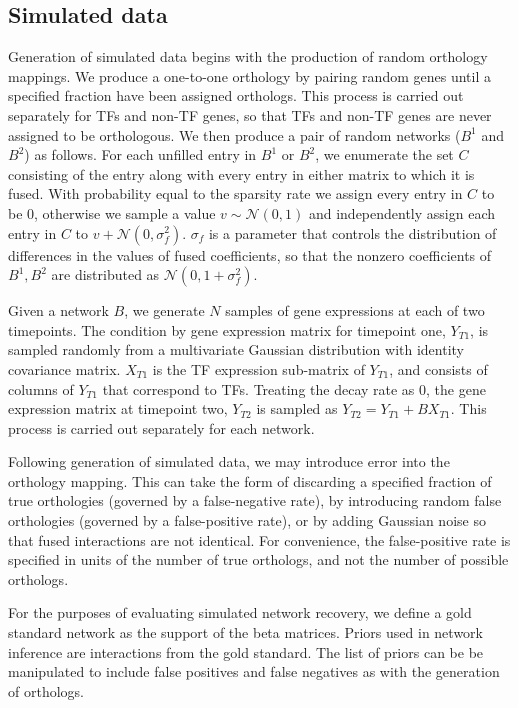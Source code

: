 \documentclass[11pt]{article}
\begin{document}
\subsection{Simulated data}
Generation of simulated data begins with the production of random orthology mappings. We produce a one-to-one orthology by pairing random genes until a specified fraction have been assigned orthologs. This process is carried out separately for TFs and non-TF genes, so that TFs and non-TF genes are never assigned to be orthologous. We then produce a pair of random networks ($B^1$ and $B^2$) as follows. For each unfilled entry in $B^1$ or $B^2$, we enumerate the set $C$ consisting of the entry along with every entry in either matrix to which it is fused. With probability equal to the sparsity rate we assign every entry in $C$ to be 0, otherwise we sample a value $v \sim \mathcal{N}(0,1)$ and independently assign each entry in $C$ to $v + \mathcal{N}(0, \sigma_f^2)$. $\sigma_f$ is a parameter that controls the distribution of differences in the values of fused coefficients, so that the nonzero coefficients of $B^1, B^2$ are distributed as $\mathcal{N}(0, 1 + \sigma_f^2)$.

Given a network $B$, we generate $N$ samples of gene expressions at each of two timepoints. The condition by gene expression matrix for timepoint one, $Y_{T1}$, is sampled randomly from a multivariate Gaussian distribution with identity covariance matrix. $X_{T1}$ is the TF expression sub-matrix of $Y_{T1}$, and consists of columns of $Y_{T1}$ that correspond to TFs. Treating the decay rate as 0, the gene expression matrix at timepoint two, $Y_{T2}$ is sampled as $Y_{T2} = Y_{T1} + BX_{T1}$. This process is carried out separately for each network. 

Following generation of simulated data, we may introduce error into the orthology mapping. This can take the form of discarding a specified fraction of true orthologies (governed by a false-negative rate), by introducing random false orthologies (governed by a false-positive rate), or by adding Gaussian noise so that fused interactions are not identical. For convenience, the false-positive rate is specified in units of the number of true orthologs, and not the number of possible orthologs. 

For the purposes of evaluating simulated network recovery, we define a gold standard network as the support of the beta matrices. Priors used in network inference are interactions from the gold standard. The list of priors can be be manipulated to include false positives and false negatives as with the generation of orthologs. 
\end{document}

